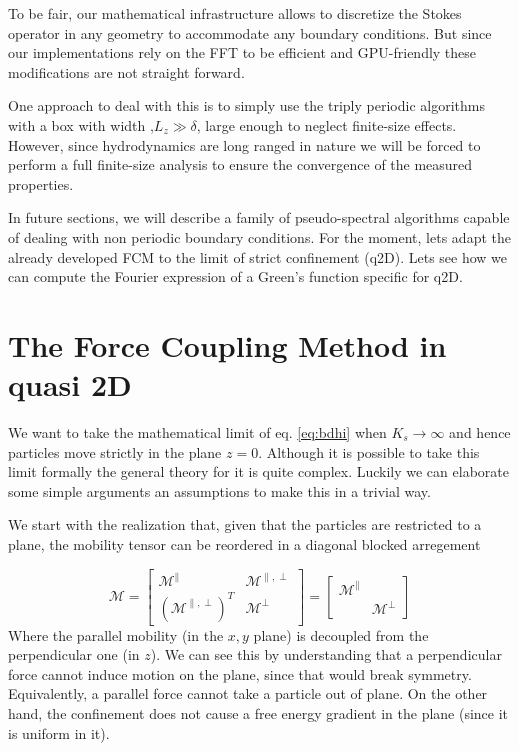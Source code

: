 \documentclass[ twoside,openright,titlepage,numbers=noenddot,%
headinclude,footinclude,cleardoublepage=empty,abstract=on,
BCOR=5mm,paper=a4,fontsize=11pt, dvipsnames
]{scrreprt}
\newcommand{\tens}[1]{\bm{\mathcal{#1}}}
\newcommand{\gpu}{\gls{GPU}\xspace}
\begin{document}
To be fair, our mathematical infrastructure allows to discretize the Stokes operator in any geometry to accommodate any boundary conditions. But since our implementations rely on the \gls{FFT} to be efficient and \gpu-friendly these modifications are not straight forward. 

One approach to deal with this is to simply use the triply periodic algorithms with a box with width ,$L_z\gg \delta$, large enough to neglect finite-size effects. However, since hydrodynamics are long ranged in nature we will be forced to perform a full finite-size analysis to ensure the convergence of the measured properties.

In future sections, we will describe a family of pseudo-spectral algorithms capable of dealing with non periodic boundary conditions. For the moment, lets adapt the already developed \gls{FCM} to the limit of strict confinement (q2D). Lets see how we can compute the Fourier expression of a Green's function specific for q2D.

\section{The Force Coupling Method in quasi 2D}

We want to take the mathematical limit of eq. \eqref{eq:bdhi} when $K_s\rightarrow\infty$ and hence particles move strictly in the plane $z=0$. Although it is possible to take this limit formally the general theory for it is quite complex. Luckily we can elaborate some simple arguments an assumptions to make this in a trivial way.

We start with the realization that, given that the particles are restricted to a plane, the mobility tensor can be reordered in a diagonal blocked arregement 

\begin{equation}
\tens M=\left[\begin{array}{cc}
\tens M^{\parallel} & \tens M^{\parallel,\perp}\\
\left(\tens M^{\parallel,\perp}\right)^{T} & \tens M^{\perp}
\end{array}\right]=\left[\begin{array}{cc}
\tens M^{\parallel}\\
 & \tens M^{\perp}
\end{array}\right]
\end{equation}
Where the parallel mobility (in the $x,y$ plane) is decoupled from the perpendicular one (in $z$). We can see this by understanding that a perpendicular force cannot induce motion on the plane, since that would break symmetry. Equivalently, a parallel force cannot take a particle out of plane. On the other hand, the confinement does not cause a free energy gradient in the plane (since it is uniform in it).
\end{document}
